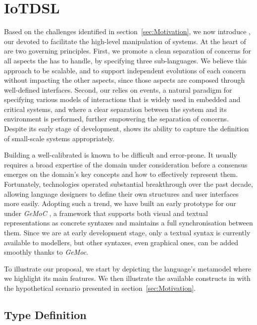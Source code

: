 \section{IoTDSL}
\label{sec:IoTDSL}

Based on the challenges identified in section~\ref{sec:Motivation}, we now introduce \IOTDSL, our \DSL devoted to facilitate the high-level manipulation of \IOT systems. At the heart of \IOTDSL are two governing principles. First, we promote a clean separation of concerns for all aspects the \DSL has to handle, by specifying three sub-languages. We believe this approach to be scalable, and to support independent evolutions of each concern without impacting the other aspects, since those aspects are composed through well-defined interfaces. Second, our \DSL relies on events, a natural paradigm for specifying various models of interactions that is widely used in embedded and critical systems, and where a clear separation between the system and its environment is performed, further empowering the separation of concerns. Despite its early stage of development, \IOTDSL shows its ability to capture the definition of small-scale \IOT systems appropriately.

Building a well-calibrated \DSL is known to be difficult and error-prone. It usually requires a broad expertise of the domain under consideration before a consensus emerges on the domain's key concepts and how to effectively represent them. Fortunately, \MDE technologies operated substantial breakthrough over the past decade, allowing language designers to define their own \DSL structures and user interfaces more easily. Adopting such a trend, we have built an early prototype for our \DSL under \textit{GeMoC} \cite{bousse-16}, a \MDE framework that supports both visual and textual representations as concrete syntaxes and maintains a full synchronisation between them. Since we are at early development stage, only a textual syntax is currently available to modellers, but other syntaxes, even graphical ones, can be added smoothly thanks to \textit{GeMoc}.

To illustrate our proposal, we start by depicting the language's metamodel where we highlight its main features. We then illustrate the available constructs in \IOTDSL with the hypothetical scenario presented in section~\ref{sec:Motivation}.

\subsection{Type Definition}
\label{sec:IoTDSL-Type}

